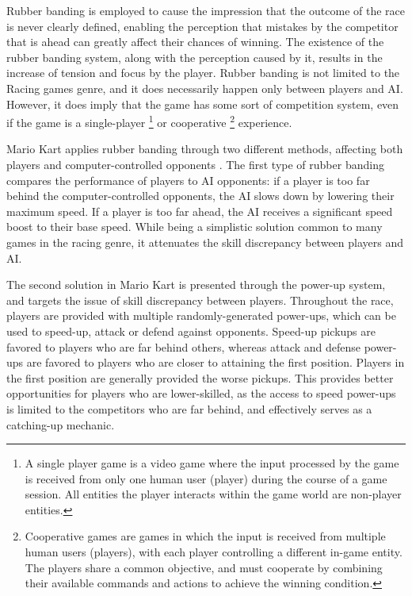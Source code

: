 \documentclass[cic,tc,english]{iiufrgs}
\begin{document}
Rubber banding is employed to cause the impression that the outcome of the race is never clearly defined, enabling the perception that mistakes by the competitor that is ahead can greatly affect their chances of winning. The existence of the rubber banding system, along with the perception caused by it, results in the increase of tension and focus by the player. Rubber banding is not limited to the Racing games genre, and it does necessarily happen only between players and AI. However, it does imply that the game has some sort of competition system, even if the game is a single-player \footnote{A single player game is a video game where the input processed by the game is received from only one human user (player) during the course of a game session. All entities the player interacts within the game world are non-player entities.} or cooperative \footnote{Cooperative games are games in which the input is received from multiple human users (players), with each player controlling a different in-game entity. The players share a common objective, and must cooperate by combining their available commands and actions to achieve the winning condition.} experience.

Mario Kart applies rubber banding through two different methods, affecting both players and computer-controlled opponents \cite{website_rubberbandingmariokart}. The first type of rubber banding compares the performance of players to AI opponents: if a player is too far behind the computer-controlled opponents, the AI slows down by lowering their maximum speed. If a player is too far ahead, the AI receives a significant speed boost to their base speed. While being a simplistic solution common to many games in the racing genre, it attenuates the skill discrepancy between players and AI. 

The second solution in Mario Kart is presented through the power-up system, and targets the issue of skill discrepancy between players. Throughout the race, players are provided with multiple randomly-generated power-ups, which can be used to speed-up, attack or defend against opponents. Speed-up pickups are favored to players who are far behind others, whereas attack and defense power-ups are favored to players who are closer to attaining the first position. Players in the first position are generally provided the worse pickups. This provides better opportunities for players who are lower-skilled, as the access to speed power-ups is limited to the competitors who are far behind, and effectively serves as a catching-up mechanic.
\end{document}
